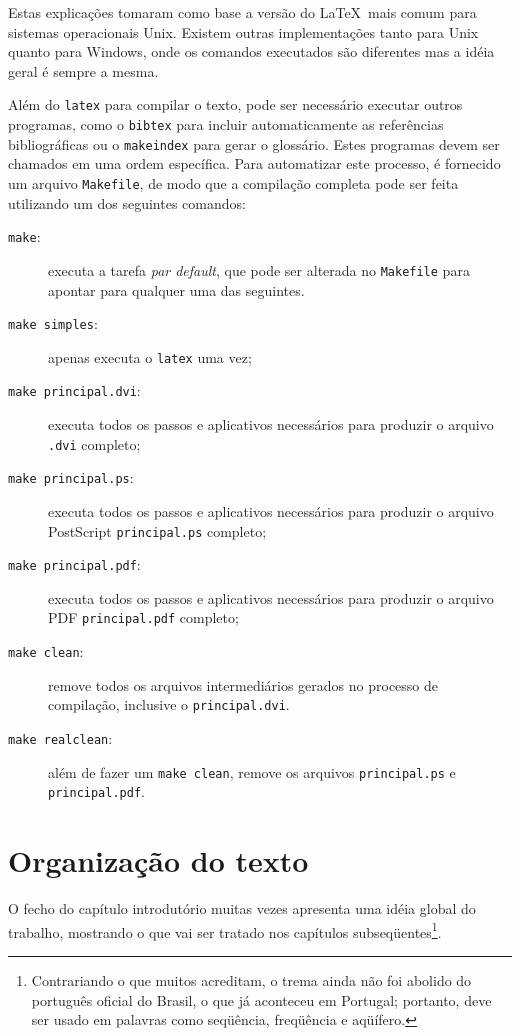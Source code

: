 Estas explicações tomaram como base a versão do \LaTeX\ mais comum para
sistemas operacionais Unix. Existem outras implementações tanto para
Unix quanto para Windows, onde os comandos executados são diferentes
mas a idéia geral é sempre a mesma.

Além do \texttt{latex} para compilar o texto, pode ser necessário
executar outros programas, como o \texttt{bibtex} para incluir
automaticamente as referências bibliográficas ou o \texttt{makeindex}
para gerar o glossário. Estes programas devem ser chamados em uma
ordem específica. Para automatizar este processo, é fornecido um
arquivo \texttt{Makefile}, de modo que a compilação completa pode
ser feita utilizando um dos seguintes comandos:%
%
\begin{description}
\item[{\tt make}:] executa a tarefa \emph{par default}, que pode ser
alterada no \texttt{Makefile} para apontar para qualquer uma das seguintes.
\item[{\tt make simples}:] apenas executa o \texttt{latex} uma vez;
\item[{\tt make principal.dvi}:] executa todos os passos e aplicativos
necessários para produzir o arquivo \texttt{.dvi} completo;
\item[{\tt make principal.ps}:] executa todos os passos e aplicativos
necessários para produzir o arquivo PostScript \texttt{principal.ps}
completo;
\item[{\tt make principal.pdf}:] executa todos os passos e aplicativos
necessários para produzir o arquivo PDF \texttt{principal.pdf} completo;
\item[{\tt make clean}:] remove todos os arquivos intermediários gerados
no processo de compilação, inclusive o \texttt{principal.dvi}.
\item[{\tt make realclean}:] além de fazer um \texttt{make clean}, remove
os arquivos \texttt{principal.ps} e \texttt{principal.pdf}.
\end{description}

\section{Organização do texto}

O fecho do capítulo introdutório muitas vezes apresenta uma idéia
global do trabalho, mostrando o que vai ser tratado nos capítulos
subseqüentes\footnote{Contrariando o que muitos acreditam, o trema
ainda não foi abolido do português oficial do Brasil, o que já
aconteceu em Portugal; portanto, deve ser usado em palavras como
seqüência, freqüência e aqüífero.}.

